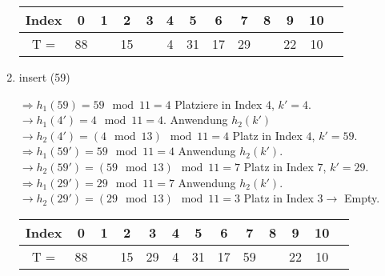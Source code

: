 \begin{enumerate}
\begin{center}
\begin{tabular}{|c|c|c|c|c|c|c|c|c|c|c|c|c|}
\hline
Index & 0 & 1 & 2 & 3 & 4 & 5 & 6 & 7 & 8 & 9 & 10\\
\hline
T = & 88 &  & 15 &  & 4 & 31 & 17 & 29 &  & 22 & 10\\
\hline
\end{tabular}
\end{center}

\item insert (59)

$\Rightarrow h_1(59) = 59 \mod 11 = 4$ Platziere in Index $4$, $k' = 4$.\\
$\rightarrow h_1(4') = 4 \mod 11 = 4$. Anwendung $h_2(k')$\\ 
$\rightarrow h_2(4') = (4 \mod 13) \mod 11 = 4$ Platz in Index $4$, $k' = 59$.\\
$\Rightarrow h_1(59') = 59 \mod 11 = 4$ Anwendung $h_2(k')$.\\
$\rightarrow h_2(59') = (59 \mod 13) \mod 11 = 7$ Platz in Index $7$, $k' = 29$.\\
$\Rightarrow h_1(29') = 29 \mod 11 = 7$ Anwendung $h_2(k')$.\\
$\rightarrow h_2(29') = (29 \mod 13) \mod 11 = 3$ Platz in Index $3 \rightarrow$ Empty.\\

\begin{center}
\begin{tabular}{|c|c|c|c|c|c|c|c|c|c|c|c|c|}
\hline
Index & 0 & 1 & 2 & 3 & 4 & 5 & 6 & 7 & 8 & 9 & 10\\
\hline
T = & 88 &  & 15 & 29 & 4 & 31 & 17 & 59 &  & 22 & 10\\
\hline
\end{tabular}
\end{center}

\end{enumerate}